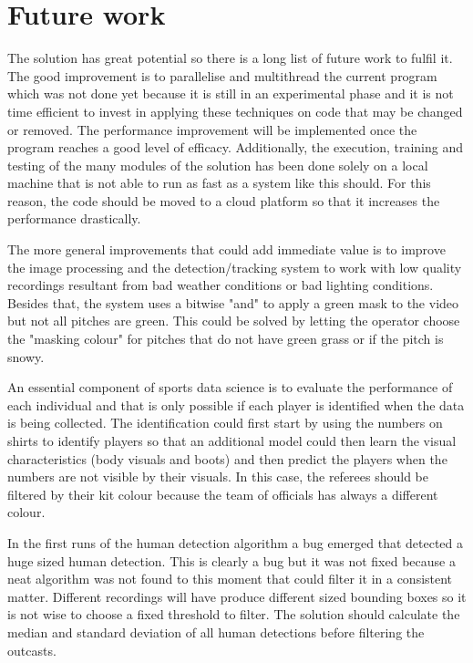 \documentclass[
    11pt,
    oneside
]{report}
\begin{document}
\section{Future work}




The solution has great potential so there is a long list of future work to fulfil it. The good improvement is to parallelise and multithread the current program which was not done yet because it is still in an experimental phase and it is not time efficient to invest in applying these techniques on code that may be changed or removed. The performance improvement will be implemented once the program reaches a good level of efficacy. Additionally, the execution, training and testing of the many modules of the solution has been done solely on a local machine that is not able to run as fast as a system like this should. For this reason, the code should be moved to a cloud platform so that it increases the performance drastically.


The more general improvements that could add immediate value is to improve the image processing and the detection/tracking system to work with low quality recordings resultant from bad weather conditions or bad lighting conditions. Besides that, the system uses a bitwise "and" to apply a green mask to the video but not all pitches are green. This could be solved by letting the operator choose the "masking colour" for pitches that do not have green grass or if the pitch is snowy.


An essential component of sports data science is to evaluate the performance of each individual and that is only possible if each player is identified when the data is being collected. The identification could first start by using the numbers on shirts to identify players so that an additional model could then learn the visual characteristics (body visuals and boots) and then predict the players when the numbers are not visible by their visuals. In this case, the referees should be filtered by their kit colour because the team of officials has always a different colour.


In the first runs of the human detection algorithm a bug emerged that detected a huge sized human detection. This is clearly a bug but it was not fixed because a neat algorithm was not found to this moment that could filter it in a consistent matter. Different recordings will have produce different sized bounding boxes so it is not wise to choose a fixed threshold to filter. The solution should calculate the median and standard deviation of all human detections before filtering the outcasts.
\end{document}

